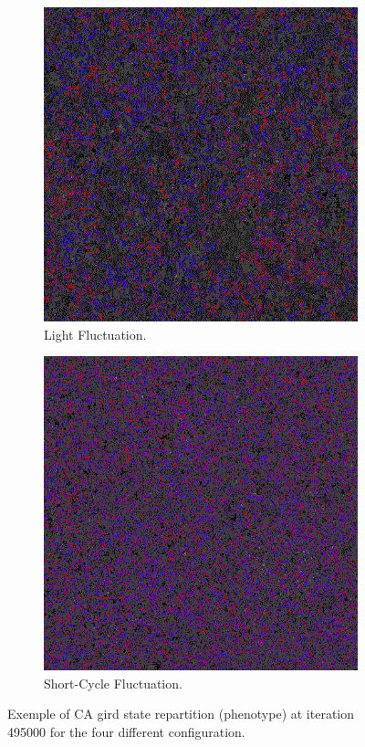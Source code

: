 \begin{figure}[H]
\begin{subfigure}{.25\textwidth}
  \centering
  \includegraphics[width=.9\linewidth]{img/light495000}
  \caption{Light Fluctuation.}
\end{subfigure}%
\begin{subfigure}{.25\textwidth}
  \centering
  \includegraphics[width=.9\linewidth]{img/small495000}
  \caption{Short-Cycle Fluctuation.}
\end{subfigure}
\caption{Exemple of CA gird state repartition (phenotype) at iteration 495000 for the four different configuration.}
\label{fig:phenoexpl}
\end{figure}



